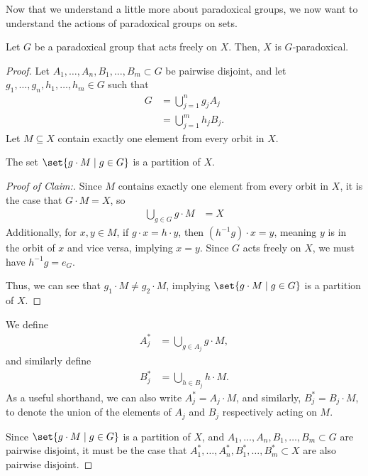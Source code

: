 Now that we understand a little more about paradoxical groups, we now want to understand the actions of paradoxical groups on sets.
\begin{proposition}
  Let $G$ be a paradoxical group that acts freely on $X$. Then, $X$ is $G$-paradoxical.
\end{proposition}
\begin{proof}
  Let $A_1,\dots,A_n,B_1,\dots,B_m\subset G$ be pairwise disjoint, and let $g_1,\dots,g_n,h_1,\dots,h_m\in G$ such that
  \begin{align*}
    G &= \bigcup_{j=1}^{n}g_jA_j\\
      &= \bigcup_{j=1}^{m}h_jB_j.
  \end{align*}
  Let $M\subseteq X$ contain exactly one element from every orbit in $X$.\newline
  \begin{claim}[]
  The set $\set{g\cdot M\mid g\in G}$ is a partition of $X$.
  \end{claim}
  \begin{proof}[Proof of Claim:]
  Since $M$ contains exactly one element from every orbit in $X$, it is the case that $G\cdot M = X$, so
  \begin{align*}
    \bigcup_{g\in G} g\cdot M &= X
  \end{align*}
  Additionally, for $x,y\in M$, if $g\cdot x = h\cdot y$, then $\left(h^{-1}g\right)\cdot x = y$, meaning $y$ is in the orbit of $x$ and vice versa, implying $x = y$. Since $G$ acts freely on $X$, we must have $h^{-1}g = e_G$.\newline

  Thus, we can see that $g_1\cdot M \neq g_2\cdot M$, implying $\set{g\cdot M\mid g\in G}$ is a partition of $X$.
  \end{proof}

  We define
  \begin{align*}
    A_j^{\ast} &= \bigcup_{g\in A_j}g\cdot M,
  \end{align*}
  and similarly define
  \begin{align*}
    B_j^{\ast} &= \bigcup_{h\in B_j}h\cdot M.
  \end{align*}
  As a useful shorthand, we can also write $A_j^{\ast} = A_j\cdot M$, and similarly, $B_j^{\ast} = B_j\cdot M$, to denote the union of the elements of $A_j$ and $B_j$ respectively acting on $M$.\newline

  Since $\set{g\cdot M\mid g\in G}$ is a partition of $X$, and $A_1,\dots,A_n,B_1,\dots,B_m\subset G$ are pairwise disjoint, it must be the case that $A_1^{\ast},\dots,A_n^{\ast},B_1^{\ast},\dots,B_m^{\ast}\subset X$ are also pairwise disjoint.\newline


\end{proof}
